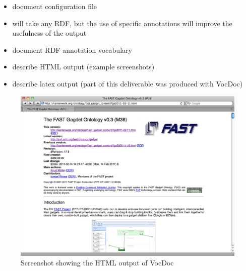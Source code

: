\documentclass{article}
\begin{document}




\begin{itemize}
	\item document configuration file
	\item will take any RDF, but the use of specific annotations will improve the usefulness of the output 
	\item document RDF annotation vocabulary 
	\item describe HTML output (example screenshots)
	\item describe latex output (part of this deliverable was produced with VocDoc)
\end{itemize}

\begin{figure}
  \begin{center}
    \includegraphics[width=\linewidth]{images/vocdoc_preamble}
    \caption{Screenshot showing the HTML output of VocDoc}
    \label{fig:vocdoc_preamble}
  \end{center}
\end{figure}
\end{document}
